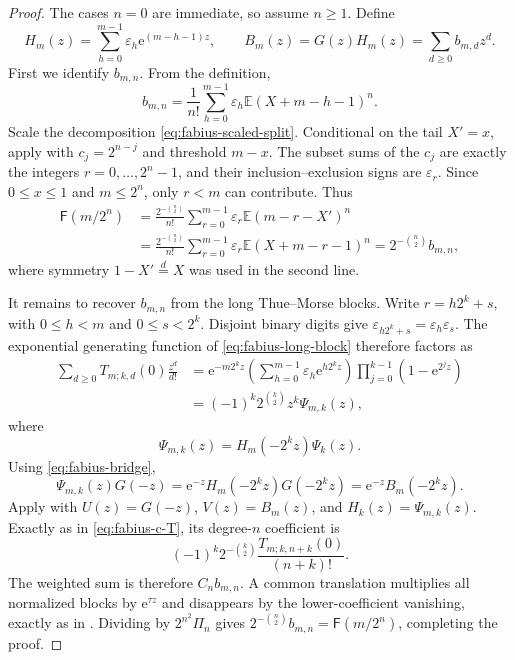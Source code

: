 \documentclass[11pt,oneside,openany]{book}
\theoremstyle{definition}
\theoremstyle{remark}
\newcommand{\eps}{\varepsilon}
\newcommand{\e}{\mathrm e}
\newcommand{\Expect}{\mathbb E}
\newcommand{\Fab}{\mathsf F}
\begin{document}
\begin{proof}
The cases $n=0$ are immediate, so assume $n\ge1$.  Define
\begin{equation}\label{eq:fabius-Hm-Bm}
 H_m(z)=\sum_{h=0}^{m-1}\eps_h\e^{(m-h-1)z},
 \qquad
 B_m(z)=G(z)H_m(z)=\sum_{d\ge0}b_{m,d}z^d.
\end{equation}
First we identify $b_{m,n}$.  From the definition,
\begin{equation}\label{eq:fabius-bmn-moment}
 b_{m,n}=\frac1{n!}\sum_{h=0}^{m-1}\eps_h
          \Expect(X+m-h-1)^n.
\end{equation}
Scale the decomposition \eqref{eq:fabius-scaled-split}.  Conditional on the
tail $X'=x$, apply  with
$c_j=2^{n-j}$ and threshold $m-x$.  The subset sums of the $c_j$ are exactly
the integers $r=0,\ldots,2^n-1$, and their inclusion--exclusion signs are
$\eps_r$.  Since $0\le x\le1$ and $m\le2^n$, only $r<m$ can contribute.
Thus
\begin{align*}
 \Fab(m/2^n)
 &=\frac{2^{-\binom n2}}{n!}
   \sum_{r=0}^{m-1}\eps_r\Expect(m-r-X')^n\\
 &=\frac{2^{-\binom n2}}{n!}
   \sum_{r=0}^{m-1}\eps_r\Expect(X+m-r-1)^n
 =2^{-\binom n2}b_{m,n},
\end{align*}
where symmetry $1-X'\overset d=X$ was used in the second line.

It remains to recover $b_{m,n}$ from the long Thue--Morse blocks.  Write
$r=h2^k+s$, with $0\le h<m$ and $0\le s<2^k$.  Disjoint binary digits give
$\eps_{h2^k+s}=\eps_h\eps_s$.  The exponential generating function of
\eqref{eq:fabius-long-block} therefore factors as
\begin{align*}
 \sum_{d\ge0}T_{m;k,d}(0)\frac{z^d}{d!}
 &=\e^{-m2^kz}
   \left(\sum_{h=0}^{m-1}\eps_h\e^{h2^kz}\right)
   \prod_{j=0}^{k-1}(1-\e^{2^jz})\\
 &=(-1)^k2^{\binom k2}z^k\Psi_{m,k}(z),
\end{align*}
where
\[
 \Psi_{m,k}(z)=H_m(-2^kz)\Psi_k(z).
\]
Using \eqref{eq:fabius-bridge},
\[
 \Psi_{m,k}(z)G(-z)
 =\e^{-z}H_m(-2^kz)G(-2^kz)
 =\e^{-z}B_m(-2^kz).
\]
Apply  with
$U(z)=G(-z)$, $V(z)=B_m(z)$, and $H_k(z)=\Psi_{m,k}(z)$.  Exactly as in
\eqref{eq:fabius-c-T}, its degree-$n$ coefficient is
\[
 (-1)^k2^{-\binom k2}\frac{T_{m;k,n+k}(0)}{(n+k)!}.
\]
The weighted sum is therefore $C_nb_{m,n}$.  A common translation multiplies
all normalized blocks by $\e^{\tau z}$ and disappears by the lower-coefficient
vanishing, exactly as in .  Dividing by
$2^{n^2}\Pi_n$ gives
$2^{-\binom n2}b_{m,n}=\Fab(m/2^n)$, completing the proof.
\end{proof}
\end{document}
